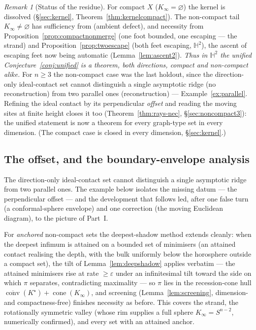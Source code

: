 \documentclass[11pt]{article}
\theoremstyle{remark}
\newtheorem{remark}[theorem]{Remark}
\newcommand{\X}{X}
\begin{document}
\begin{remark}[Status of the residue]\label{rem:residuestatus}
For compact $\X$ ($K_{\infty}=\varnothing$) the kernel is dissolved
(\S\ref{sec:kernel}, Theorem~\ref{thm:kernelcompact}). The non-compact
tail $K_{\infty}\neq\varnothing$ has sufficiency from \cite[Thm.~4.1]
{R1} (ambient defect), and necessity from
Proposition~\ref{prop:compactnonmerge} (one foot bounded, one escaping
--- the strand) and Proposition~\ref{prop:twoescape} (both feet
escaping, $\mathbb{H}^{2}$), the ascent of escaping feet now being
automatic (Lemma~\ref{lem:ascent2}). \emph{Thus in $\mathbb{H}^{2}$ the
unified Conjecture~\ref{conj:unified} is a theorem, both directions,
compact and non-compact alike.} For $n\ge3$ the non-compact case was
the last holdout, since the direction-only ideal-contact set cannot
distinguish a single asymptotic ridge (no reconstruction) from two
parallel ones (reconstruction) --- Example~\ref{ex:parallel}. Refining
the ideal contact by its perpendicular \emph{offset} and reading the
moving sites at finite height closes it too
(Theorem~\ref{thm:rays-nec}, \S\ref{sec:noncompact3}): the unified
statement is now a theorem for every graph-type set in every dimension.
(The compact case is closed in every dimension, \S\ref{sec:kernel}.)
\end{remark}

\subsection{The offset, and the boundary-envelope
analysis}\label{sec:genesis-offset}
The direction-only ideal-contact set cannot distinguish a single
asymptotic ridge from two parallel ones. The example below isolates the
missing datum --- the perpendicular offset --- and the development that
follows led, after one false turn (a conformal-sphere envelope) and one
correction (the moving Euclidean diagram), to the picture of Part~I.

For \emph{anchored} non-compact sets the deepest-shadow method extends
cleanly: when the deepest infimum is attained on a bounded set of
minimisers (an attained contact realising the depth, with the bulk
uniformly below the horosphere outside a compact set), the tilt of
Lemma~\ref{lem:deepshadow} applies verbatim --- the attained
minimisers rise at rate $\ge\varepsilon$ under an infinitesimal tilt
toward the side on which $\pi$ separates, contradicting maximality ---
so $\pi$ lies in the recession-cone hull
$\overline{\operatorname{conv}}(K^{\star})+\operatorname{cone}
(K_{\infty})$, and screening (Lemma~\ref{lem:screening}, dimension- and
compactness-free) finishes necessity as before. This covers the
strand, the rotationally symmetric valley (whose rim supplies a full
sphere $K_{\infty}=S^{n-2}$, numerically confirmed), and every set with
an attained anchor.
\end{document}
